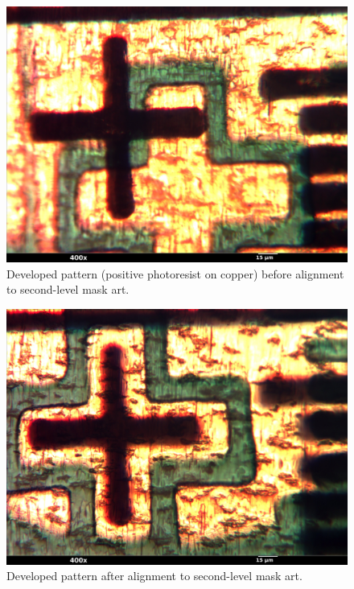 \documentclass[twocolumn]{article}
\begin{document}
\begin{figure}[h]
\begin{center}
\includegraphics[scale=0.06]{mask010_annotated.jpg}
\end{center}
\caption{Developed pattern (positive photoresist on copper) before alignment to second-level mask art.}
\label{alignment-1}
\end{figure}

\begin{figure}[h!]
\begin{center}
\includegraphics[scale=0.06]{mask009_annotated.jpg}
\end{center}
\caption{Developed pattern after alignment to second-level mask art.}
\label{alignment-2}
\end{figure}
\end{document}
